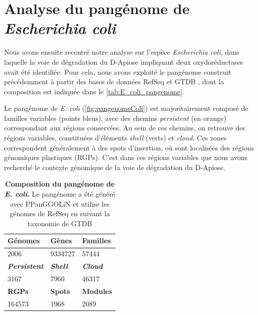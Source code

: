 \newpage

\section{Analyse du pangénome de \textit{Escherichia coli}}

Nous avons ensuite recentré notre analyse sur l’espèce \textit{Escherichia coli}, dans laquelle la voie de dégradation du D-Apiose impliquant deux oxydoréductases avait été identifiée. Pour cela, nous avons exploité le pangénome construit précédemment à partir des bases de données RefSeq et GTDB \cite{pruitt_ncbi_2007,parks_standardized_2018}, dont la composition est indiquée dans le \autoref{tab:E_coli_pangenome}.

Le pangénome de \textit{E. coli} (\autoref{fig:pangenomeColi}) est majoritairement composé de familles variables (points bleus), avec des chemins \textit{persistent} (en orange) correspondant aux régions conservées. Au sein de ces chemins, on retrouve des régions variables, constituées d’éléments \textit{shell} (verts) et \textit{cloud}. Ces zones correspondent généralement à des spots d’insertion, où sont localisées des régions génomiques plastiques (RGPs). C’est dans ces régions variables que nous avons recherché le contexte génomique de la voie de dégradation du D-Apiose.


\begin{table}[htbp]
    \centering
    \begin{tabular}{|l|l|l|}
    \hline
    \textbf{Génomes} & \textbf{Gènes} & \textbf{Familles} \\
    \hline
    2006 & 9334727 & 57444 \\
    \hline
    \hline
    \textit{\textbf{Persistent}} & \textit{\textbf{Shell}} & \textit{\textbf{Cloud}} \\
    \hline
    3167 & 7960 & 46317\\
    \hline
    \hline
    \textbf{RGPs} & \textbf{Spots} & \textbf{Modules} \\
    \hline
    164573 & 1968 & 2089 \\
    \hline
    \end{tabular}
    \caption[Composition du pangénome de \textit{E. coli}]{\textbf{Composition du pangénome de \textit{E. coli}.} Le pangénome a été généré avec PPanGGOLiN et utilise les génomes de RefSeq \cite{pruitt_ncbi_2007} en suivant la taxonomie de GTDB \cite{parks_standardized_2018}}
    \label{tab:E_coli_pangenome}
\end{table}

